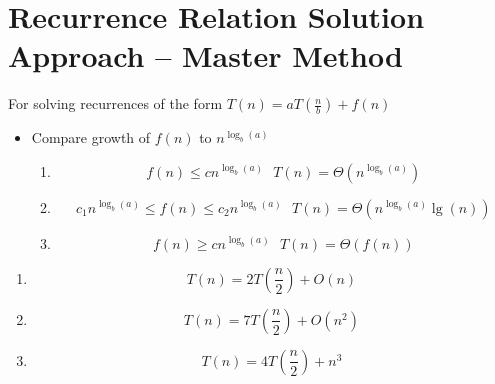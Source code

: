 \documentclass[12pt]{report}
\begin{document}
\section{Recurrence Relation Solution Approach -- Master Method}\label{sec:recurrence-relation-solution-approach-master-method}
For solving recurrences of the form $T(n)=aT\left(\frac{n}{b}\right)+f(n)$
\begin{itemize}
	\item Compare growth of $f(n)$ to $n^{\log_{b}(a)}$		%
	\begin{enumerate}[label=Case \arabic*)]
	    \item \[ f(n) \leq cn^{\log_{b}(a)} \mbox{     } T(n)=\Theta(n^{\log_{b}(a)})\]
	    \item \[ c_{1}n^{\log_{b}(a)} \leq f(n) \leq c_{2}n^{\log_{b}(a)} \mbox{     } T(n)=\Theta(n^{\log_{b}(a)}\lg(n))\]
	    \item \[ f(n) \geq cn^{\log_{b}(a)} \mbox{     } T(n)=\Theta(f(n))\]
	\end{enumerate}
\end{itemize}

\begin{enumerate}[label=\arabic*., start=7]
    \item \[ T(n)=2T\left(\frac{n}{2}\right) + O(n)\]
	\item \[ T(n)=7T\left( \frac{n}{2} \right) + O(n^{2}) \]
	\item \[ T(n)=4T\left( \frac{n}{2} \right) + n^{3} \]
\end{enumerate}
\end{document}
